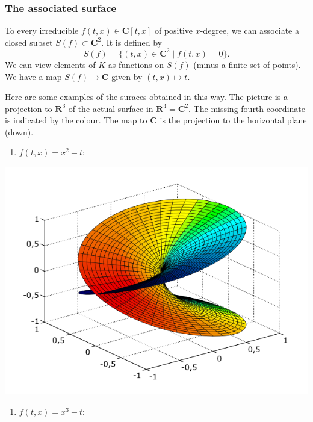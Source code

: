 \documentclass[11pt]{article}
\begin{document}
\subsubsection{The associated surface}
\label{sec:org4f1d30f}
To every irreducible \(f(t,x) \in \mathbf{C}[t,x]\) of positive \(x\)-degree, we can associate a closed subset \(S(f) \subset \mathbf{C}^2\).
It is defined by
\[ S(f) = \{(t,x) \in \mathbf{C}^2 \mid f(t,x) = 0\}.\]
We can view elements of \(K\) as functions on \(S(f)\) (minus a finite set of points).
We have a map \(S(f) \to \mathbf{C}\) given by \((t,x) \mapsto t\).

Here are some examples of the suraces obtained in this way.
The picture is a projection to \(\mathbf{R}^3\) of the actual surface in \(\mathbf{R}^4 = \mathbf{C}^2\).
The missing fourth coordinate is indicated by the colour.
The map to \(\mathbf{C}\) is the projection to the horizontal plane (down).

\begin{enumerate}
\item \(f(t,x) = x^2 - t\):
\end{enumerate}
\begin{center}
\includegraphics[width=.9\linewidth]{assets/Course_notes/2023-03-24_14-32-34_620px-Riemann_sqrt.svg.png}
\end{center}


\begin{enumerate}
\item \(f(t,x) = x^3 - t\):
\end{enumerate}
\end{document}

